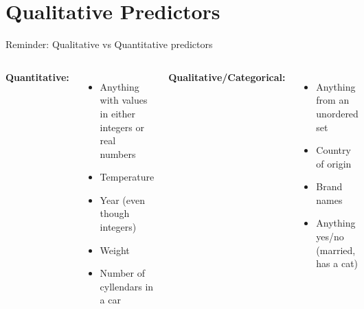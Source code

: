 \documentclass[aspectratio=169,usenames,dvipsnames]{beamer}
\newcommand{\InstructorList}[1]{
\begin{itemize}
	\color{orange}
	#1
\end{itemize}
}
\begin{document}
\section{Qualitative Predictors}
\begin{frame}[t]{Reminder: Qualitative vs Quantitative predictors}
\begin{columns}
\centering
\textbf{Quantitative:}
\InstructorList{
  \item Anything with values in either integers or real numbers 
  \item Temperature 
  \item Year (even though integers)
  \item Weight 
  \item Number of cyllendars in a car 
}

\centering
\textbf{Qualitative/Categorical:}
\InstructorList{
  \item Anything from an unordered set 
  \item Country of origin 
  \item Brand names 
  \item Anything yes/no (married, has a cat)
}

\end{columns}
\end{frame}
\end{document}
